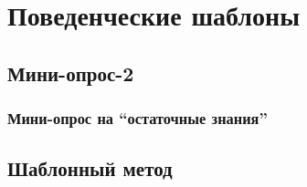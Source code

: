 \documentclass[xetex,mathserif,serif]{beamer}
\begin{document}
    \section{Поведенческие шаблоны}

    \subsection{Мини-опрос-2}

    \begin{frame}
        \frametitle{Мини-опрос на ``остаточные знания''}
    \end{frame}

    \subsection{Шаблонный метод}
\end{document}
